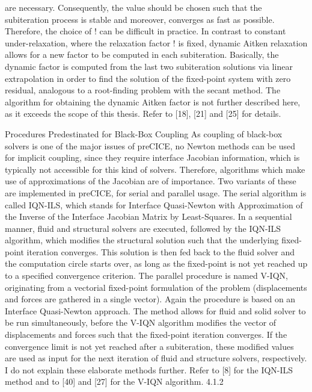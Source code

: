 are necessary. Consequently, the value should be chosen such that the subiteration process is stable and
moreover, converges as fast as possible. Therefore, the choice of ! can be difficult in practice.
In contrast to constant under-relaxation, where the relaxation factor ! is fixed, dynamic Aitken relaxation
allows for a new factor to be computed in each subiteration. Basically, the dynamic factor is computed
from the last two subiteration solutions via linear extrapolation in order to find the solution of the
fixed-point system with zero residual, analogous to a root-finding problem with the secant method. The
algorithm for obtaining the dynamic Aitken factor is not further described here, as it exceeds the scope
of this thesis. Refer to [18], [21] and [25] for details.

Procedures Predestinated for Black-Box Coupling
As coupling of black-box solvers is one of the major issues of preCICE, no Newton methods can be used
for implicit coupling, since they require interface Jacobian information, which is typically not accessible
for this kind of solvers. Therefore, algorithms which make use of approximations of the Jacobian are
of importance. Two variants of these are implemented in preCICE, for serial and parallel usage. The
serial algorithm is called IQN-ILS, which stands for Interface Quasi-Newton with Approximation of the
Inverse of the Interface Jacobian Matrix by Least-Squares. In a sequential manner, fluid and structural
solvers are executed, followed by the IQN-ILS algorithm, which modifies the structural solution such that
the underlying fixed-point iteration converges. This solution is then fed back to the fluid solver and the
computation circle starts over, as long as the fixed-point is not yet reached up to a specified convergence
criterion.
The parallel procedure is named V-IQN, originating from a vectorial fixed-point formulation of the
problem (displacements and forces are gathered in a single vector). Again the procedure is based on an
Interface Quasi-Newton approach. The method allows for fluid and solid solver to be run simultaneously,
before the V-IQN algorithm modifies the vector of displacements and forces such that the fixed-point
iteration converges. If the convergence limit is not yet reached after a subiteration, these modified values
are used as input for the next iteration of fluid and structure solvers, respectively.
I do not explain these elaborate methods further. Refer to [8] for the IQN-ILS method and to [40] and
[27] for the V-IQN algorithm.
4.1.2

